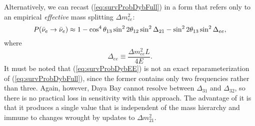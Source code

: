 \documentclass[../thesis.tex]{subfiles}
\begin{document}
Alternatively, we can recast (\ref{eq:survProbDybFull}) in a form that refers
only to an empirical \emph{effective} mass splitting $\Delta m^2_{ee}$:
\begin{equation}
  \label{eq:survProbDybEE}
  P(\bar\nu_e \rightarrow \bar\nu_e) \approx 1 - \cos^4\theta_{13}\sin^2 2\theta_{12} \sin^2 \Delta_{21}
  - \sin^2 2\theta_{13}\sin^2\Delta_{ee},
\end{equation}
where
\[ \Delta_{ee} \equiv \frac{\Delta m^2_{ee}L}{4E}. \] It must be noted that
(\ref{eq:survProbDybEE}) is not an exact reparameterization of
(\ref{eq:survProbDybFull}), since the former contains only two frequencies
rather than three. Again, however, Daya Bay cannot resolve between $\Delta_{31}$
and $\Delta_{32}$, so there is no practical loss in sensitivity with this
approach. The advantage of it is that it produces a single value that is
independent of the mass hierarchy and immune to changes wrought by updates to
$\Delta m^2_{21}$.
\end{document}

